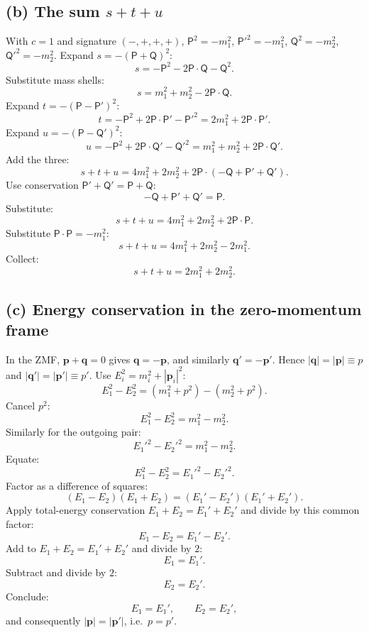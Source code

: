 \documentclass[11pt]{article}
\begin{document}
\subsection*{(b) The sum $s+t+u$}

With $c=1$ and signature $(-,+,+,+)$, $\mathsf P^2=-m_1^2$, $\mathsf P'^2=-m_1^2$, $\mathsf Q^2=-m_2^2$, $\mathsf Q'^2=-m_2^2$. Expand $s=-(\mathsf P+\mathsf Q)^2$:
\[ s = -\mathsf P^2 - 2\mathsf P\cdot\mathsf Q - \mathsf Q^2. \]
Substitute mass shells:
\[ s = m_1^2 + m_2^2 - 2\mathsf P\cdot\mathsf Q. \]
Expand $t=-(\mathsf P-\mathsf P')^2$:
\[ t = -\mathsf P^2 + 2\mathsf P\cdot\mathsf P' - \mathsf P'^2 = 2m_1^2 + 2\mathsf P\cdot\mathsf P'. \]
Expand $u=-(\mathsf P-\mathsf Q')^2$:
\[ u = -\mathsf P^2 + 2\mathsf P\cdot\mathsf Q' - \mathsf Q'^2 = m_1^2 + m_2^2 + 2\mathsf P\cdot\mathsf Q'. \]
Add the three:
\[ s+t+u = 4m_1^2 + 2m_2^2 + 2\mathsf P\cdot(-\mathsf Q + \mathsf P' + \mathsf Q'). \]
Use conservation $\mathsf P'+\mathsf Q' = \mathsf P+\mathsf Q$:
\[ -\mathsf Q+\mathsf P'+\mathsf Q' = \mathsf P. \]
Substitute:
\[ s+t+u = 4m_1^2 + 2m_2^2 + 2\mathsf P\cdot\mathsf P. \]
Substitute $\mathsf P\cdot\mathsf P = -m_1^2$:
\[ s+t+u = 4m_1^2 + 2m_2^2 - 2m_1^2. \]
Collect:
\begin{equation}
\boxed{s+t+u = 2m_1^2 + 2m_2^2.}
\end{equation}

\subsection*{(c) Energy conservation in the zero-momentum frame}

In the ZMF, $\bm p+\bm q=0$ gives $\bm q=-\bm p$, and similarly $\bm q'=-\bm p'$. Hence $|\bm q|=|\bm p|\equiv p$ and $|\bm q'|=|\bm p'|\equiv p'$. Use $E_i^2 = m_i^2+|\bm p_i|^2$:
\[ E_1^2 - E_2^2 = (m_1^2 + p^2) - (m_2^2 + p^2). \]
Cancel $p^2$:
\[ E_1^2 - E_2^2 = m_1^2 - m_2^2. \]
Similarly for the outgoing pair:
\[ E_1'^2 - E_2'^2 = m_1^2 - m_2^2. \]
Equate:
\[ E_1^2 - E_2^2 = E_1'^2 - E_2'^2. \]
Factor as a difference of squares:
\[ (E_1-E_2)(E_1+E_2) = (E_1'-E_2')(E_1'+E_2'). \]
Apply total-energy conservation $E_1+E_2=E_1'+E_2'$ and divide by this common factor:
\[ E_1 - E_2 = E_1' - E_2'. \]
Add to $E_1+E_2=E_1'+E_2'$ and divide by $2$:
\[ E_1 = E_1'. \]
Subtract and divide by $2$:
\[ E_2 = E_2'. \]
Conclude:
\begin{equation}
\boxed{E_1=E_1',\qquad E_2=E_2',}
\end{equation}
and consequently $|\bm p|=|\bm p'|$, i.e.\ $p=p'$.
\end{document}

